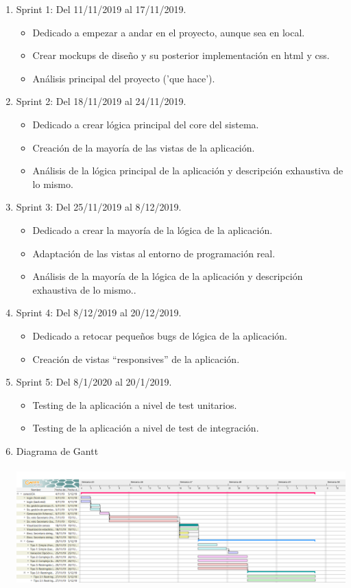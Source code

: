 \documentclass[12pt,letterpaper]{report}
\begin{document}
		\begin{enumerate}
			\item Sprint 1: Del ​11/11/2019​ al ​17/11/2019.
			\begin{itemize}
				\item Dedicado a empezar a andar en el proyecto, aunque sea en local.
				\item Crear mockups de diseño y su posterior implementación en html y css.
				\item Análisis principal del proyecto ('que hace').
			\end{itemize}
			\item Sprint 2: Del ​18/11/2019​ al ​24/11/2019.
			\begin{itemize}
				\item Dedicado a crear lógica principal del core del sistema.
				\item Creación de la mayoría de las vistas de la aplicación.
				\item Análisis de la lógica principal de la aplicación y descripción exhaustiva de lo mismo.
			\end{itemize}
			\item Sprint 3: Del ​25/11/2019​ al ​8/12/2019.
			\begin{itemize}
				\item Dedicado a crear la mayoría de la lógica de la aplicación.
				\item Adaptación de las vistas al entorno de programación real.
				\item Análisis de la mayoría de la lógica de la aplicación y descripción exhaustiva de lo mismo..
			\end{itemize}
			\item Sprint 4: Del ​8/12/2019​ al ​20/12/2019.
			\begin{itemize}
				\item Dedicado a retocar pequeños bugs de lógica de la aplicación.
				\item Creación de vistas “responsives” de la aplicación.
			\end{itemize}
			\item Sprint 5: Del ​8/1/2020​ al ​20/1/2019​.
			\begin{itemize}
				\item Testing de la aplicación a nivel de test unitarios.
				\item Testing de la aplicación a nivel de test de integración.
			\end{itemize}
			\item Diagrama de Gantt
				\\~\\
				\includegraphics[width=\textwidth]{diagrama_base}
		\end{enumerate}
\end{document}
